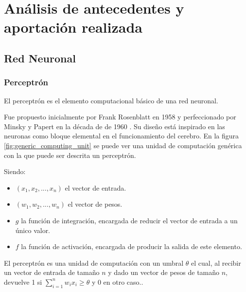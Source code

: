 \chapter{An\'alisis de antecedentes y aportaci\'on realizada}\label{analanteced}


\section{Red Neuronal}\label{sec:redneuronal}
\subsection{Perceptrón}\label{subsec:perceptron}

El perceptrón es el elemento computacional básico de una red neuronal.

Fue propuesto inicialmente por Frank Rosenblatt en 1958 y perfeccionado por Minsky y Papert en la década de de 1960 \cite[p.~55-56]{Rojas1996}.
Su diseño está inspirado en las neuronas como bloque elemental en el funcionamiento del cerebro. En la figura \ref{fig:generic_computing_unit} se puede ver una unidad de computación genérica con la que puede ser descrita un perceptrón.


Siendo:
\begin{itemize}
\item $ (x_1, x_2, ...,x_n) $ el vector de entrada.
\item $ (w_1, w_2, ...,w_n) $ el vector de pesos.
\item $ g $ la función de integración, encargada de reducir el vector de entrada a un único valor.
\item $ f $ la función de activación, encargada de producir la salida de este elemento.
\end{itemize}

El perceptrón es una unidad de computación con un umbral $ \theta $ el cual, al recibir un vector de entrada de tamaño $ n $ y dado un vector de pesos de tamaño $ n $, devuelve 1 si $ \sum_{i=1}^{n} w_i x_i \geq \theta $ y 0 en otro caso.\cite[p.~60]{Rojas1996}.

